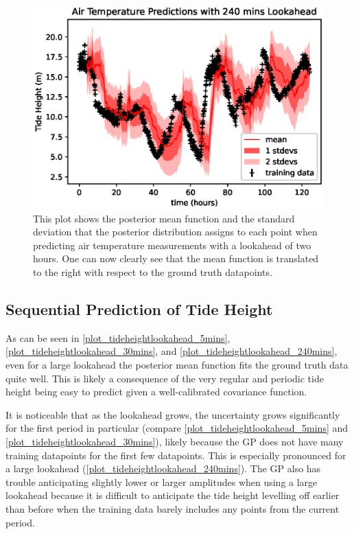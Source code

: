\documentclass{article}
\begin{document}
                \begin{figure}[ht!]
                    \includegraphics[width=\linewidth,height=\textheight,keepaspectratio]{air_temp_lookahead_240mins.eps}
                    \caption{This plot shows the posterior mean function and the standard deviation that the posterior distribution assigns to each point when predicting air temperature measurements with a lookahead of two hours. One can now clearly see that the mean function is translated to the right with respect to the ground truth datapoints.}
                    \label{plot_airtemplookahead_240mins}
                \end{figure}
            
            \FloatBarrier
            \subsection{Sequential Prediction of Tide Height}

                As can be seen in \cref{plot_tideheightlookahead_5mins}, \cref{plot_tideheightlookahead_30mins}, and \cref{plot_tideheightlookahead_240mins}, even for a large lookahead the posterior mean function fits the ground truth data quite well. This is likely a consequence of the very regular and periodic tide height being easy to predict given a well-calibrated covariance function.

                It is noticeable that as the lookahead grows, the uncertainty grows significantly for the first period in particular (compare \cref{plot_tideheightlookahead_5mins} and \cref{plot_tideheightlookahead_30mins}), likely because the GP does not have many training datapoints for the first few datapoints. This is especially pronounced for a large lookahead (\cref{plot_tideheightlookahead_240mins}).
                The GP also has trouble anticipating slightly lower or larger amplitudes when using a large lookahead because it is difficult to anticipate the tide height levelling off earlier than before when the training data barely includes any points from the current period.
\end{document}
